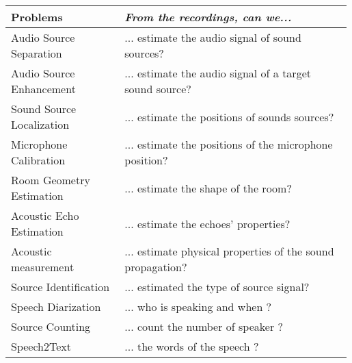 \begin{tabular}{p{0.33\linewidth} p{0.66\linewidth}}
    \toprule
    Problems & \textit{From the recordings, can we...} \\
    \midrule
    Audio Source Separation   & ... estimate the audio signal of sound sources?\\

    Audio Source Enhancement   & ... estimate the audio signal of a target sound source?\\

    Sound Source Localization & ... estimate the positions of sounds sources? \\

    Microphone Calibration    & ... estimate the positions of the microphone position? \\

    Room Geometry Estimation  & ... estimate the shape of the room? \\

    Acoustic Echo Estimation  & ... estimate the echoes' properties? \\

    Acoustic measurement      & ... estimate physical properties of the sound propagation?\\

    \hline
    Source Identification     & ... estimated the type of source signal?\\

    Speech Diarization        & ... who is speaking and when ? \\

    Source Counting           & ... count the number of speaker ? \\

    Speech2Text               & ... the words of the speech ? \\

    \bottomrule
\end{tabular}